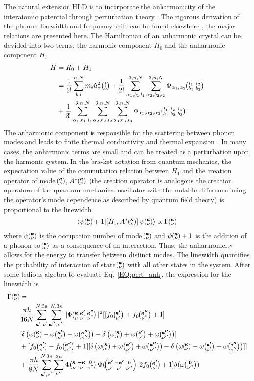 The natural extension HLD is to incorporate the anharmonicity of the interatomic potential through perturbation theory \cite{turneythesis}. The rigorous derivation of the phonon linewidth and frequency shift can be found elsewhere \cite{PhysRev.128.2589}, the major relations are presented here. The Hamiltonian of an anharmonic crystal can be devided into two terms, the harmonic component $H_0$ and the anharmonic component $H_1$
%
\begin{equation}\label{EQ:H_anh}
\begin{split}
H&=H_0+H_1\\
&=\frac{1}{2!}\sum_{b,l}^{n,N}m_b\dot{u}_\alpha^2 \lb + \frac{1}{2!}\sum_{\alpha_1,b_1,l_1}^{3,n,N}\sum_{\alpha_2,b_2,l_2}^{3,n,N}\Phi_{\alpha_1,\alpha_2} \lblb\\
&+\frac{1}{3!}\sum_{\alpha_1,b_1,l_1}^{3,n,N}\sum_{\alpha_2,b_2,l_2}^{3,n,N}\sum_{\alpha_3,b_3,l_3}^{3,n,N}\Phi_{\alpha_1,\alpha_2,\alpha_3} \lblblb\\
\end{split}
\end{equation}
%
The anharmonic component is responsible for the scattering between phonon modes and leads to finite thermal conductivity and thermal expansion \cite{srivastava1990physics}. In many cases, the anharmonic terms are small and can be treated as a perturbation upon the harmonic system. In the bra-ket notation from quantum mechanics, the expectation value of the commutation relation between $H_1$ and the creation operator of mode $\mspace{-4.0mu}\left(\mspace{-8.0mu} \begin{smallmatrix}&\pmb{\kappa} \\&\nu\end{smallmatrix} \mspace{-3.0mu}\right)$, $A^*\mspace{-4.0mu}\left(\mspace{-8.0mu} \begin{smallmatrix}&\pmb{\kappa} \\&\nu\end{smallmatrix} \mspace{-3.0mu}\right)$ (the creation operator is analogous the creation operators of the quantum mechanical oscillator with the notable difference being the operator's mode dependence as described by quantum field theory) is proportional to the linewidth
%
\begin{equation}\label{EQ:pert_anh}
\begin{split}
\langle \psi \kv+1 | [H_1,A^*\kv] | \psi \kv\rangle \propto \Gamma \kv
\end{split}
\end{equation}
%
where $\psi \mspace{-4.0mu}\left(\mspace{-8.0mu} \begin{smallmatrix}&\pmb{\kappa} \\&\nu\end{smallmatrix} \mspace{-3.0mu}\right)$ is the occupation number of mode $\mspace{-4.0mu}\left(\mspace{-8.0mu} \begin{smallmatrix}&\pmb{\kappa} \\&\nu\end{smallmatrix} \mspace{-3.0mu}\right)$ and $\psi \mspace{-4.0mu}\left(\mspace{-8.0mu} \begin{smallmatrix}&\pmb{\kappa} \\&\nu\end{smallmatrix} \mspace{-3.0mu}\right)+1$ is the addition of a phonon to $\mspace{-4.0mu}\left(\mspace{-8.0mu} \begin{smallmatrix}&\pmb{\kappa} \\&\nu\end{smallmatrix} \mspace{-3.0mu}\right)$ as a consequence of an interaction. Thus, the anharmonicity allows for the energy to transfer between distinct modes. The linewidth quantifies the probability of interaction of state $\mspace{-4.0mu}\left(\mspace{-8.0mu} \begin{smallmatrix}&\pmb{\kappa} \\&\nu\end{smallmatrix} \mspace{-3.0mu}\right)$ with all other states in the system. After some tedious algebra to evaluate Eq.~\ref{EQ:pert_anh}, the expression for the linewidth is
\begin{equation}\label{EQ:Gamma_anh}
\begin{split}
\Gamma \kv &= \\
&\frac{\pi\hbar}{16N}\SUM[']\SUM['']|\Phi\kvkvpkvpp|^2[[f_0\kvp+f_0\kvpp+1]\\
&[\delta\left(\omega\kv-\omega\kvp-\omega\kvpp\right)-\delta\left(\omega\kv+\omega\kvp+\omega\kvpp\right)]\\
&+[f_0\kvp-f_0\kvpp+1][\delta\left(\omega\kv+\omega\kvp+\omega\kvpp\right)-\delta\left(\omega\kv-\omega\kvp-\omega\kvpp\right)]]\\
&+\frac{\pi\hbar}{8N}\SUM[']\sum_{\nu''}^{3n}\Phi\kvOv\Phi(\kvpOv[2f_0\kvp+1]\delta(\omega\Ovpp)
\end{split}
\end{equation}
